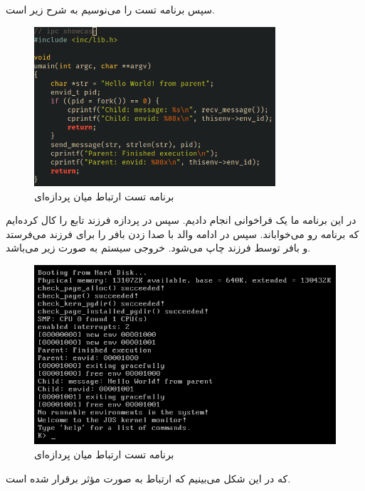\documentclass[a4paper, 12pt]{article}
\begin{document}
سپس برنامه تست را می‌نوسیم به شرح زیر است.
\begin{figure}[H]
    \centering
    \includegraphics[width=0.8\textwidth]{ipc.png}
    \caption{
        برنامه تست ارتباط میان پردازه‌ای
    }
    \label{fig6output}
\end{figure}
در این برنامه ما یک فراخوانی
انجام دادیم. سپس در پردازه فرزند تابع
را کال کرده‌ایم که برنامه رو می‌خواباند.
سپس در ادامه والد با صدا زدن
بافر را برای فرزند می‌فرستد و بافر توسط فرزند چاپ می‌شود.
خروجی سیستم به صورت زیر می‌باشد.
\begin{figure}[H]
    \centering
    \includegraphics[width=1.0\textwidth]{res.png}
    \caption{
        برنامه تست ارتباط میان پردازه‌ای
    }
    \label{fig7output}
\end{figure}
که در این شکل می‌بینیم که ارتباط به صورت مؤثر برقرار شده است.
\end{document}
